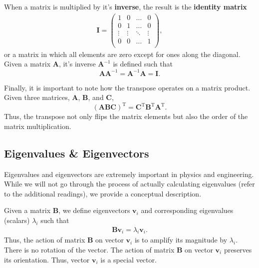 \documentclass[11pt]{article} %
\begin{document}
When a matrix is multiplied by it's \textbf{inverse}, the result is the \textbf{identity matrix}
\begin{align}
    \textbf{I}=
    \begin{pmatrix}
        1 & 0 & \hdots & 0 \\
        0 & 1 & \hdots & 0 \\
        \vdots & \vdots & \ddots & \vdots \\
        0 & 0 & \hdots & 1 \\
    \end{pmatrix}, \nonumber
\end{align}
or a matrix in which all elements are zero except for ones along the diagonal. Given a matrix \textbf{A}, it's inverse $\textbf{A}^{-1}$ is defined such that  
\begin{equation}
    \textbf{A}\textbf{A}^{-1}=\textbf{A}^{-1}\textbf{A}=\textbf{I}.
    \nonumber
\end{equation}

Finally, it is important to note how the transpose operates on a matrix product. Given three matrices, \textbf{A}, \textbf{B}, and \textbf{C}, 
\begin{equation}
    (\textbf{A} \textbf{B} \textbf{C})^\text{T} = \textbf{C}^\text{T} \textbf{B}^\text{T} \textbf{A}^\text{T}.
    \nonumber
\end{equation}
Thus, the transpose not only flips the matrix elements but also the order of the matrix multiplication.

\subsection{Eigenvalues \& Eigenvectors}
Eigenvalues and eigenvectors are extremely important in physics and engineering. While we will not go through the process of actually calculating eigenvalues (refer to the additional readings), we provide a conceptual description.

Given a matrix $\textbf{B}$, we define eigenvectors $\textbf{v}_i$ and corresponding eigenvalues (scalars) $\lambda_i$ such that
\begin{align}
    \textbf{B}\textbf{v}_i = \lambda_i\textbf{v}_i. \nonumber
\end{align}
Thus, the action of matrix $\textbf{B}$ on vector $\textbf{v}_i$ is to amplify its magnitude by $\lambda_i$. There is no rotation of the vector. The action of matrix $\textbf{B}$ on vector $\textbf{v}_i$ preserves its orientation. Thus, vector $\textbf{v}_i$ is a special vector. 
\end{document}
